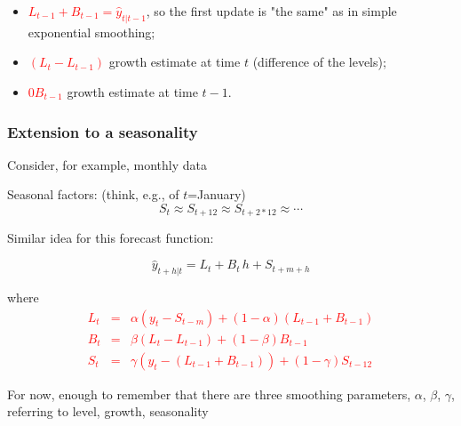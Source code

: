 \documentclass[dvipsnames,12pt]{book}
\begin{document}
                    \begin{itemize}
                        \item \textcolor{red}{$L_{t-1} + B_{t-1} = \hat{y}_{t | t-1}$}, so the first update is "the same" as in simple exponential smoothing; 
                        \item \textcolor{red}{$(L_t - L_{t-1})$} growth estimate at time $t$ (difference of the levels); 
                        \item \textcolor{red}{0$B_{t-1}$} growth estimate at time $t-1$.
                    \end{itemize}
                
                \subsubsection{Extension to a seasonality}

                    Consider, for example, monthly data 

                    Seasonal factors: (think, e.g., of $t$=January)
                    $$S_t \approx S_{t+ 12} \approx S_{t+ 2* 12} \approx \cdots  $$

                    Similar idea for this forecast function:

                    \begin{equation}
                        \hat{y}_{t+h | t} = L_t + B_t \, h + S_{t+m+h}
                    \end{equation}

                    where 
                    \textcolor{red}{\begin{eqnarray}
                      L_t &=& \alpha (y_t - S_{t-m}) + (1-\alpha) (L_{t-1} + B_{t-1})\\
                      B_t &=& \beta (L_t - L_{t-1}) + (1- \beta) B_{t-1} \\
                      S_t &=& \gamma (y_t - (L_{t-1}+B_{t-1})) + (1-\gamma) S_{t-12}
                      \end{eqnarray}}

                    For now, enough to remember that there are three smoothing parameters, $\alpha$, $\beta$, $\gamma$, referring to level, growth, seasonality


%
%        
%            
        
\end{document}
